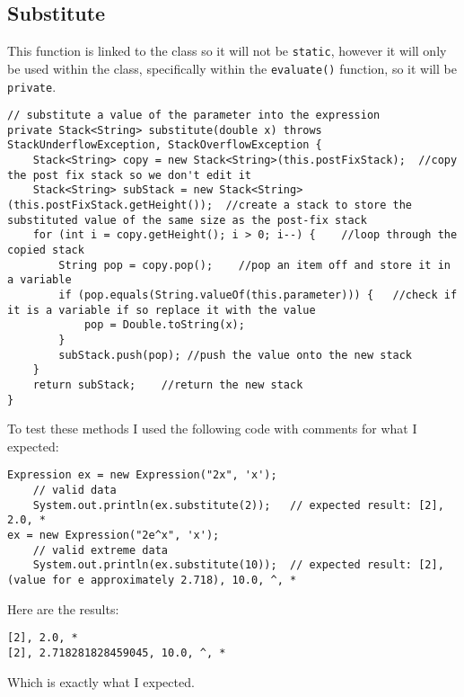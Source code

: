 \documentclass[../../../../main.tex]{subfiles}
\begin{document}
\subsection{Substitute}
This function is linked to the class so it will not be \texttt{static}, however it will only be used within the class, specifically within the \texttt{evaluate()} function, so it will be \texttt{private}.
\begin{verbatim}
// substitute a value of the parameter into the expression
private Stack<String> substitute(double x) throws StackUnderflowException, StackOverflowException {
	Stack<String> copy = new Stack<String>(this.postFixStack);	//copy the post fix stack so we don't edit it
	Stack<String> subStack = new Stack<String>(this.postFixStack.getHeight());	//create a stack to store the substituted value of the same size as the post-fix stack
	for (int i = copy.getHeight(); i > 0; i--) {	//loop through the copied stack
		String pop = copy.pop();	//pop an item off and store it in a variable
		if (pop.equals(String.valueOf(this.parameter))) {	//check if it is a variable if so replace it with the value
			pop = Double.toString(x);
		}
		subStack.push(pop);	//push the value onto the new stack 
	}
	return subStack;	//return the new stack
}
\end{verbatim}
To test these methods I used the following code with comments for what I expected:
\begin{verbatim}
Expression ex = new Expression("2x", 'x');
	// valid data
	System.out.println(ex.substitute(2));	// expected result: [2], 2.0, *
ex = new Expression("2e^x", 'x');
	// valid extreme data
	System.out.println(ex.substitute(10));	// expected result: [2], (value for e approximately 2.718), 10.0, ^, *
\end{verbatim}
Here are the results:
\begin{verbatim}
[2], 2.0, *
[2], 2.718281828459045, 10.0, ^, *
\end{verbatim}
Which is exactly what I expected.
\newpage
\end{document}
